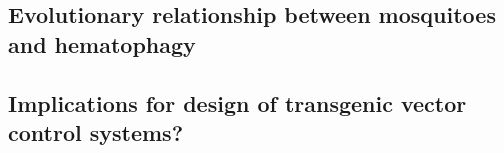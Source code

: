 \subsection{Evolutionary relationship between mosquitoes and hematophagy}
\dummytext[3]

\subsection{Implications for design of transgenic vector control systems?}
\dummytext[3]


